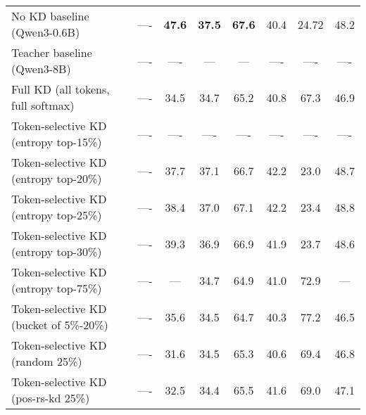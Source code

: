 \documentclass[11pt]{article}
\begin{document}
\begin{table*}[t]
{\begin{tabular}{lccccccc}
		\midrule
		No KD baseline (Qwen3-0.6B)      		   & ----    & \textbf{47.6} 	      & \textbf{37.5}             & \textbf{67.6} 	      	& 40.4                        & 24.72                   & 48.2          \\
		Teacher baseline (Qwen3-8B)      		   & ----    & ----                   & ---                       & ---                 	& ----                        & ----                    & ----          \\
		\midrule
		Full KD (all tokens, full softmax)         & ----    & 34.5                  & 34.7                      & 65.2                 & 40.8                        & 67.3                    & 46.9          \\
		Token-selective KD (entropy top-15\%)      & ----    & ----                  & ----                      & ----                 & ----                        & ----                    & ----          \\
		Token-selective KD (entropy top-20\%)      & ----    & 37.7                  & 37.1                      & 66.7                 & 42.2                        & 23.0                    & 48.7          \\
		Token-selective KD (entropy top-25\%)      & ----    & 38.4                  & 37.0                      & 67.1                 & 42.2                        & 23.4                    & 48.8          \\
		Token-selective KD (entropy top-30\%)      & ----    & 39.3                  & 36.9                      & 66.9                 & 41.9                        & 23.7                    & 48.6          \\
		Token-selective KD (entropy top-75\%)      & ----    & ---                   & 34.7                      & 64.9                 & 41.0                        & 72.9                    & ---           \\
		Token-selective KD (bucket of 5\%-20\%)    & ----    & 35.6                  & 34.5                      & 64.7                 & 40.3                        & 77.2                    & 46.5          \\
		Token-selective KD (random 25\%)           & ----    & 31.6                  & 34.5                      & 65.3                 & 40.6                        & 69.4                    & 46.8          \\
		Token-selective KD (pos-rs-kd 25\%)        & ----    & 32.5                  & 34.4                      & 65.5                 & 41.6                        & 69.0                    & 47.1          \\

\end{tabular}}
\end{table*}
\end{document}

